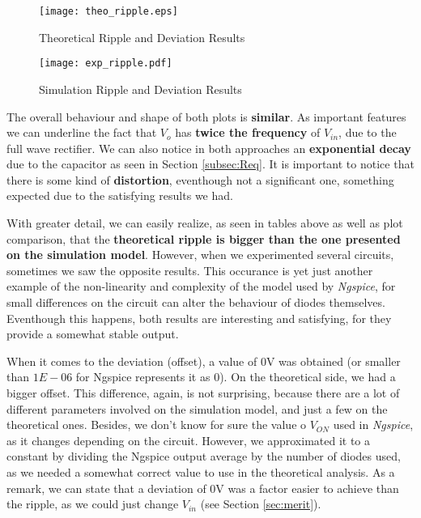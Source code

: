 \pagebreak

\begin{figure}[h]
    \centering
  \texttt{[image: theo\_ripple.eps]}
 \caption{Theoretical Ripple and Deviation Results}
\end{figure}

\begin{figure}[h]
    \centering
  \texttt{[image: exp\_ripple.pdf]}
  \caption{Simulation Ripple and Deviation Results}
\end{figure}

\pagebreak

The overall behaviour and shape of both plots is \textbf{similar}. As important features we can underline the fact that $V_o$ has \textbf{twice the frequency} of $V_{in}$, due to the full wave rectifier. We can also notice in both approaches an \textbf{exponential decay} due to the capacitor as seen in Section \ref{subsec:Req}.
It is important to notice that there is some kind of \textbf{distortion}, eventhough not a significant one, something expected due to the satisfying results we had.

With greater detail, we can easily realize, as seen in tables above as well as plot comparison, that the \textbf{theoretical ripple is bigger than the one presented on the simulation model}. 
However, when we experimented several circuits, sometimes we saw the opposite results. This occurance is yet just another example of the non-linearity and complexity of the model used by \textit{Ngspice}, for small differences on the circuit can alter the behaviour of diodes themselves. Eventhough this happens, both results are interesting and satisfying, for they provide a somewhat stable output.

When it comes to the deviation (offset), a value of 0V was obtained (or smaller than $1E-06$ for Ngspice represents it as 0). On the theoretical side, we had a bigger offset. This difference, again, is not surprising, because there are a lot of different parameters involved on the simulation model, and just a few on the theoretical ones. Besides, we don't know for sure the value o $V_{ON}$ used in \textit{Ngspice}, as it changes depending on the circuit. However, we approximated it to a constant by dividing the Ngspice output average by the number of diodes used, as we needed a somewhat correct value to use in the theoretical analysis.
As a remark, we can state that a deviation of 0V was a factor easier to achieve than the ripple, as we could just change $V_{in}$ (see Section \ref{sec:merit}). 

